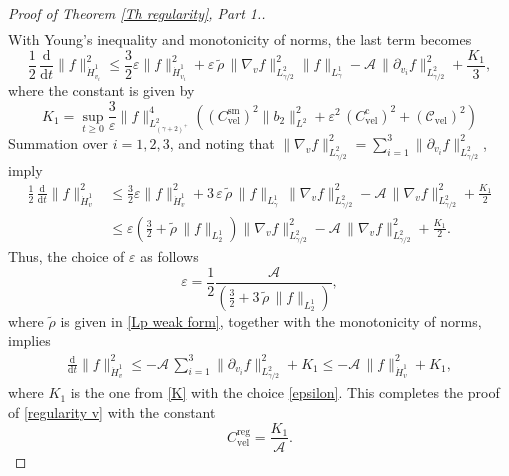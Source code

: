 \documentclass[11pt,a4paper]{amsart}
\newcommand{\md}{\mathrm{d}}
\newcommand{\g}{\gamma}
\newcommand{\mA}{\mathcal{A}}
\newcommand{\K}{K_1}
\newcommand{\Csvel}{C_{\text{vel}}^{\text{sm}}}
\newcommand{\Crgvel}{C_{\text{vel}}^{\text{reg}}}
\newcommand{\Clvel}{\mathcal{C}_{\text{vel}}}
\newcommand{\Ccmvel}{C_{\text{vel}}^{\text{c}}}
\begin{document}
\begin{proof}[Proof of Theorem \ref{Th regularity}, Part 1.]
\begin{multline*}
\end{multline*}
With Young's inequality and monotonicity of norms, the last term becomes
\begin{equation*}
	\frac{1}{2} \,\frac{\md}{\md t}\| f \|_{\dot{H}^{1}_{v_i}}^2 \leq
\frac{3}{2} \varepsilon \| f \|_{\dot{H}^{1}_{v_i}}^2
	+   \varepsilon \, \tilde{ \rho }\,   \| \nabla_v f    \|^2_{L^2_{ {\g}/{2}}}  \|  	f    \|_{L^1_{\g}} 	 
	- \mA \,  \| \partial_{v_i} f    \|_{{L}^{2}_{\g/2}}^2 +  \frac{\K}{3},
\end{equation*}
where the constant is given by
\begin{equation}\label{K}
\K = 
\sup_{t\geq0} \frac{3}{ \varepsilon} \| f \|_{L^{2}_{(\gamma+2)^+}}^4  \left(	\left(\Csvel \right)^2\|b_2\|_{L^{2}}^2
+   \varepsilon^2 \,    \left( \Ccmvel \right)^2   +   \left(\Clvel \right)^2   \right) 
\end{equation}
Summation over $i=1,2,3$, and noting that  $\| \nabla_{v} f    \|_{{L}^{2}_{\g/2}}^2  =  \sum_{i=1}^{3} \| \partial_{v_i} f    \|_{{L}^{2}_{\g/2}}^2$,
 imply
 \begin{equation*}
 	\begin{split}
	\frac{1}{2} \,\frac{\md}{\md t}\| f \|_{\dot{H}^{1}_{v}}^2  & \leq
	\frac{3}{2} \varepsilon \| f \|_{\dot{H}^{1}_{v}}^2
	+ 3\,  \varepsilon \, \tilde{ \rho }\,   \|  	f    \|_{L^1_{\g}} 	  \,  \| \nabla_v f    \|^2_{L^2_{ {\g}/{2}}} 
	- \mA\,  \| \nabla_{v} f    \|_{{L}^{2}_{\g/2}}^2 + 	\frac{\K}{2}
	\\
	& \leq  \varepsilon  \left( 	\frac{3}{2}    +    \tilde{ \rho }\,   \|  	f    \|_{L^1_{2}} 	   \right)  \| \nabla_v f    \|^2_{L^2_{ {\g}/{2}}} 
	- \mA \,  \| \nabla_{v} f    \|_{{L}^{2}_{\g/2}}^2 + 	\frac{\K}{2}.
	\end{split}
\end{equation*}
Thus, the choice of $\varepsilon$ as follows
\begin{equation}\label{epsilon}
	\varepsilon = \frac{1}{2 } \frac{\mA}{ \left( 	\frac{3}{2}    +    3 \, \tilde{ \rho }\,   \|  	f    \|_{L^1_{2}} 	   \right)},
\end{equation}
where $\tilde{\rho}$ is given in \eqref{Lp weak form}, 
together with the monotonicity  of norms, implies
\begin{equation*}
	\begin{split}
	 \frac{\md}{\md t}\| f \|_{\dot{H}^{1}_{v}}^2 \leq
		-  \mA\, \sum_{i=1}^{3} \| \partial_{v_i} f    \|_{{L}^{2}_{\g/2}}^2 +  \K \leq 	-  \mA \,  \| f \|_{\dot{H}^{1}_{v}}^2 + \K,
	\end{split}
\end{equation*}
where $\K$ is the one from \eqref{K} with the choice \eqref{epsilon}. This completes the proof of \eqref{regularity v} with the constant 
\begin{equation}\label{C reg vel}
\Crgvel =  \frac{\K}{\mA}.
\end{equation}
\end{proof}
\end{document}

